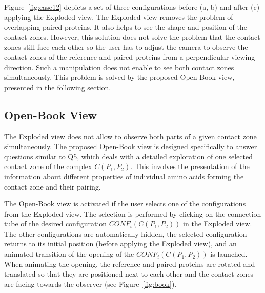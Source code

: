 \documentclass{bmcart}
\def\OpBook {Open-Book view\xspace}
\def\ExpView {Exploded view\xspace}
\begin{document}
Figure~\ref{fig:case12} depicts a set of three configurations before (a, b) and after (c) applying the \ExpView.
The Exploded view removes the problem of overlapping paired proteins.
It also helps to see the shape and position of the contact zones.
However, this solution does not solve the problem that the contact zones still face each other so the user has to adjust the camera to observe the contact zones of the reference and paired proteins from a perpendicular viewing direction. 
Such a manipulation does not enable to see both contact zones simultaneously.
This problem is solved by the proposed \OpBook, presented in the following section.



\subsection*{Open-Book View}
The \ExpView does not allow to observe both parts of a given contact zone simultaneously.
The proposed \OpBook is designed specifically to answer questions similar to Q5, which deals with a detailed exploration of one selected contact zone of the complex $C(P_1,P_2)$.
This involves the presentation of the information about different properties of individual amino acids forming the contact zone and their pairing.

The \OpBook is activated if the user selects one of the configurations from the \ExpView. 
The selection is performed by clicking on the connection tube of the desired configuration $CONF_i(C(P_1,P_2))$ in the \ExpView.
The other configurations are automatically hidden, the selected configuration returns to its initial position (before applying the \ExpView), and an animated transition of the opening of the $CONF_i(C(P_1,P_2))$ is launched.
When animating the opening, the reference and paired proteins are rotated and translated so that they are positioned next to each other and the contact zones are facing towards the observer (see Figure~\ref{fig:book}). 
\end{document}

